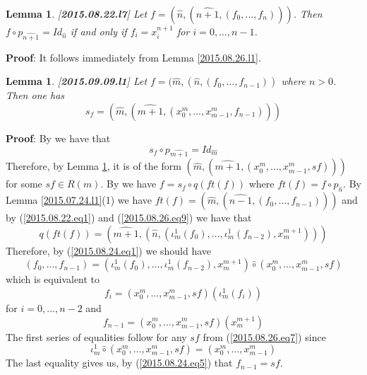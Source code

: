 \documentclass[11pt]{article}
\newenvironment{proof}{{\bf Proof}:}{\vskip 5mm }
\newtheorem{lemma}[proposition]{Lemma}
\newcommand{\llabel}[1]{\label{#1}[{\bf #1}]}
\newcommand{\wh}{\widehat}
\newcommand{\hc}{\wh{\circ}}
\begin{document}
%
\begin{lemma}
\llabel{2015.08.22.l7}
Let $f=(\wh{n},(\wh{n+1},(f_0,\dots,f_n)))$. Then $f\circ p_{\wh{n+1}}=Id_{\wh{n}}$ if and only if $f_i=x_i^{n+1}$ for $i=0,\dots,n-1$.
\end{lemma}
%
\begin{proof}
It follows immediately from Lemma \ref{2015.08.26.l1}.
\end{proof}
%
\begin{lemma}
\llabel{2015.09.09.l1}
Let $f=(\wh{m},(\wh{n},(f_0,\dots,f_{n-1}))$ where $n>0$. Then one has
%
$$s_f=(\wh{m},(\wh{m+1},(x_0^m,\dots,x_{m-1}^m,f_{n-1})))$$
%
\end{lemma}
%
\begin{proof}
By \cite[Definition 2.3(2)]{Csubsystems} we have that 
%
$$s_f\circ p_{\wh{m+1}}=Id_{\wh{m}}$$
%
Therefore, by Lemma \ref{2015.08.22.l7}, it is of the form $(\wh{m},(\wh{m+1},(x_0^m,\dots,x_{m-1}^m,sf)))$ for some $sf\in R(m)$. By \cite[Definition 2.3(3)]{Csubsystems} we have $f=s_f\circ q(ft(f))$ where $ft(f)=f\circ p_{\wh{n}}$. By Lemma \ref{2015.07.24.l1}(1) we have $ft(f)=(\wh{m},(\wh{n-1},(f_0,\dots,f_{n-1})))$ and by (\ref{2015.08.22.eq1}) and (\ref{2015.08.26.eq9}) we have that 
%
$$q(ft(f))=(\wh{m+1},(\wh{n},(\iota_m^1(f_0),\dots,\iota_m^1(f_{n-2}),x_{m}^{m+1})))$$
%
Therefore, by (\ref{2015.08.24.eq1}) we should have
%
$$(f_0,\dots,f_{n-1})=(\iota_m^1(f_0),\dots,\iota_m^1(f_{n-2}),x_{m}^{m+1})\hc (x_0^m,\dots,x_{m-1}^m,sf)$$
%
which is equivalent to 
%
$$f_i=(x_0^m,\dots,x_{m-1}^m,sf)(\iota_m^1(f_i))$$
%
for $i=0,\dots,n-2$ and 
%
$$f_{n-1}=(x_0^m,\dots,x_{m-1}^m,sf)(x_{m}^{m+1})$$
%
The first series of equalities follow for any $sf$ from (\ref{2015.08.26.eq7}) since 
%
$$\iota_m^1\hc (x_0^m,\dots,x_{m-1}^m,sf)=(x_0^m,\dots,x_{m-1}^m)$$
%
The last equality gives us, by (\ref{2015.08.24.eq5}) that $f_{n-1}=sf$.
\end{proof}
%
\end{document}
